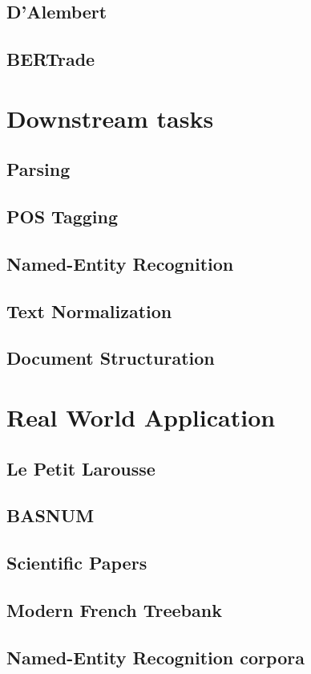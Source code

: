 \documentclass{mimosis}
\begin{document}
\chapter{D'Alembert}
\chapter{BERTrade}

\part{Downstream tasks}
\chapter{Parsing}
\chapter{POS Tagging}
\chapter{Named-Entity Recognition}
\chapter{Text Normalization}
\chapter{Document Structuration}

\part{Real World Application}
\chapter{Le Petit Larousse}
\chapter{BASNUM}
\chapter{Scientific Papers}
\chapter{Modern French Treebank}
\chapter{Named-Entity Recognition corpora}


\backmatter

\begingroup
\let\clearpage\relax
\glsaddall
\printglossary[type=\acronymtype]
\newpage
\printglossary
\endgroup

\printindex
\printbibliography
\end{document}
